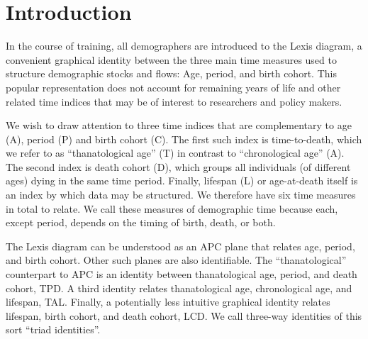 \documentclass[12pt,oneside,a4paper]{article} %
\begin{document}
\section{Introduction}
In the course of training, all demographers are introduced
to the Lexis diagram, a convenient graphical identity between the three main
time measures used to structure demographic stocks and flows: Age, period, and birth cohort.
This popular representation does not account for remaining years of life and
other related time indices that may be of interest to researchers and
policy makers. %

We wish to draw attention to three time indices that are complementary to age
(A), period (P) and birth cohort (C). The first such index is time-to-death,
which we refer to as ``thanatological age'' (T) in contrast to ``chronological
age'' (A). The second index is death cohort (D), which groups all individuals
(of different ages) dying in the same time period. Finally, lifespan (L) or
age-at-death itself is an index by which data may be structured.
We therefore have six time measures in total to relate. We call these measures of demographic
time because each, except period, depends on the timing of birth, death, or
both.

The Lexis diagram can be understood as an APC plane
that relates age, period, and birth cohort. Other such planes are
also identifiable.
The ``thanatological'' counterpart to APC is an identity between thanatological
age, period, and death cohort, TPD. A third identity relates thanatological age, chronological age, and lifespan, TAL. Finally, a potentially less
intuitive graphical identity relates lifespan, birth cohort, and death
cohort, LCD. We call three-way identities of this sort ``triad identities''.
\end{document}
